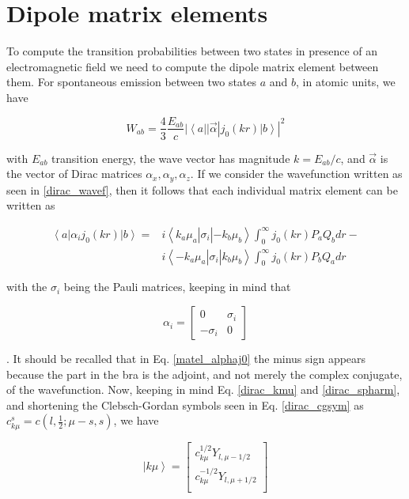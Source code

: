 \documentclass[]{report}
\newcommand{\bra}[1]{\left<#1\right|}
\newcommand{\ket}[1]{\left|#1\right>}
\newcommand{\braket}[3]{\bra{#1}#2\ket{#3}}
\begin{document}
\section{Dipole matrix elements}

To compute the transition probabilities between two states in presence of an electromagnetic field we need to compute the dipole matrix element between them. For spontaneous emission between two states $a$ and $b$, in atomic units, we have \cite{payne1955}

\begin{equation}\label{trans_prob}
W_{ab} = \frac{4}{3}\frac{E_{ab}}{c}|\braket{a}{|\vec{\alpha}|j_0(kr)}{b}|^2
\end{equation}

with $E_{ab}$ transition energy, the wave vector has magnitude $k=E_{ab}/c$, and $\vec{\alpha}$ is the vector of Dirac matrices $\alpha_x, \alpha_y, \alpha_z$.
If we consider the wavefunction written as seen in \ref{dirac_wavef}, 
then it follows that each individual matrix element can be written as

\begin{align}\label{matel_alphaj0}
\braket{a}{\alpha_ij_0(kr)}{b} = & i\braket{k_a\mu_a}{\sigma_i}{-k_b\mu_b}\int_{0}^{\infty}j_0(kr)P_aQ_b dr - \\
& i\braket{-k_a\mu_a}{\sigma_i}{k_b\mu_b}\int_{0}^{\infty}j_0(kr)P_bQ_a dr \nonumber
\end{align}

with the $\sigma_i$ being the Pauli matrices, keeping in mind that

\begin{equation}
\alpha_i = \begin{bmatrix}
0 & \sigma_i \\
-\sigma_i & 0
\end{bmatrix}
\end{equation}

. It should be recalled that in Eq. \ref{matel_alphaj0} the minus sign appears because the part in the bra is the adjoint, and not merely the complex conjugate, of the wavefunction. Now, keeping in mind Eq. \ref{dirac_kmu} and \ref{dirac_spharm}, and shortening the Clebsch-Gordan symbols seen in Eq. \ref{dirac_cgsym} as $c_{k\mu}^s = c(l,\frac{1}{2};\mu-s, s)$, we have

\begin{equation}
\ket{k\mu} = \begin{bmatrix}
c_{k\mu}^{1/2} Y_{l,\mu-1/2} \\
c_{k\mu}^{-1/2} Y_{l,\mu+1/2} \\
\end{bmatrix}
\end{equation}
\end{document}

